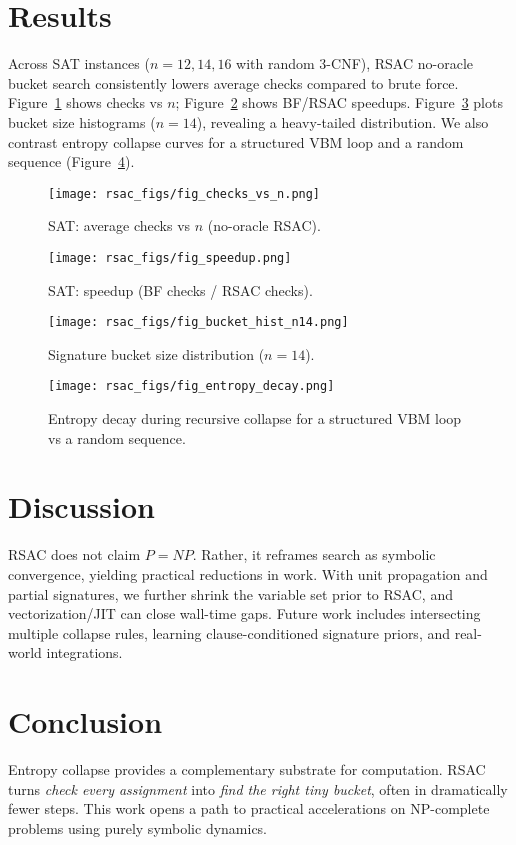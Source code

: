\documentclass[11pt]{article}
\begin{document}
\section{Results}
Across SAT instances ($n=12,14,16$ with random 3-CNF), RSAC no-oracle bucket search consistently lowers average checks compared to brute force. Figure~\ref{fig:checks} shows checks vs $n$; Figure~\ref{fig:speedup} shows BF/RSAC speedups. Figure~\ref{fig:buckets} plots bucket size histograms ($n=14$), revealing a heavy-tailed distribution. We also contrast entropy collapse curves for a structured VBM loop and a random sequence (Figure~\ref{fig:entropy}).

\begin{figure}[h]
\centering
\texttt{[image: rsac\_figs/fig\_checks\_vs\_n.png]}
\caption{SAT: average checks vs $n$ (no-oracle RSAC).}
\label{fig:checks}
\end{figure}

\begin{figure}[h]
\centering
\texttt{[image: rsac\_figs/fig\_speedup.png]}
\caption{SAT: speedup (BF checks / RSAC checks).}
\label{fig:speedup}
\end{figure}

\begin{figure}[h]
\centering
\texttt{[image: rsac\_figs/fig\_bucket\_hist\_n14.png]}
\caption{Signature bucket size distribution ($n=14$).}
\label{fig:buckets}
\end{figure}

\begin{figure}[h]
\centering
\texttt{[image: rsac\_figs/fig\_entropy\_decay.png]}
\caption{Entropy decay during recursive collapse for a structured VBM loop vs a random sequence.}
\label{fig:entropy}
\end{figure}

\section{Discussion}
RSAC does not claim $P=NP$. Rather, it reframes search as symbolic convergence, yielding practical reductions in work. With unit propagation and partial signatures, we further shrink the variable set prior to RSAC, and vectorization/JIT can close wall-time gaps. Future work includes intersecting multiple collapse rules, learning clause-conditioned signature priors, and real-world integrations.

\section{Conclusion}
Entropy collapse provides a complementary substrate for computation. RSAC turns \emph{check every assignment} into \emph{find the right tiny bucket}, often in dramatically fewer steps. This work opens a path to practical accelerations on NP-complete problems using purely symbolic dynamics.


\end{document}

